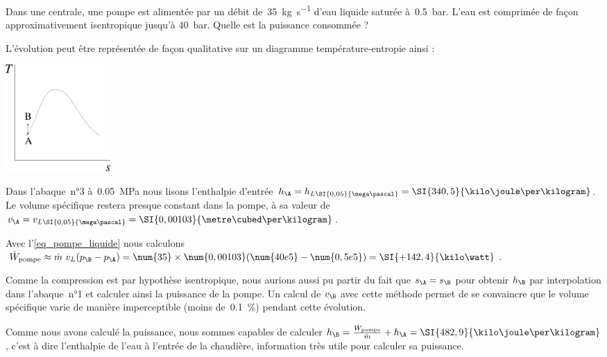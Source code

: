 			\onlyframabook{\clearfloats}
		 	\begin{anexample}
		 	\label{exemple_pompe_centrale}
		 		Dans une centrale, une pompe est alimentée par un débit de~\SI{35}{\kilogram\per\second} d’eau liquide saturée à~\SI{0,5}{\bar}. L’eau est comprimée de façon approximativement isentropique jusqu’à \SI{40}{\bar}. Quelle est la puissance consommée ?
		 			\begin{answer}
			 			L’évolution peut être représentée de façon qualitative sur un diagramme température-entropie ainsi :
						\begin{center}\includegraphics[width=4cm]{images/exe_ts_pompe.png}\end{center}
		 				Dans l’abaque~n°3 à~\SI{0,05}{\mega\pascal} nous lisons l’enthalpie d’entrée $h_\A = h_{L \SI{0,05}{\mega\pascal}} = \SI{340,5}{\kilo\joule\per\kilogram}$. Le volume spécifique restera presque constant dans la pompe, à sa valeur de $v_\A = v_{L \SI{0,05}{\mega\pascal}} = \SI{0,00103}{\metre\cubed\per\kilogram}$.
		 				
		 				Avec l’\cref{eq_pompe_liquide} nous calculons $\dot W_\text{pompe} \approx \dot m \ v_L (p_\B - p_\A ) = \num{35} \times \num{0,00103} (\num{40e5} - \num{0,5e5}) = \SI{+142,4}{\kilo\watt}$.
		 				
		 					\begin{remark}Comme la compression est par hypothèse isentropique, nous aurions aussi pu partir du fait que $s_\A = s_\B$ pour obtenir $h_\B$ par interpolation dans l’abaque~n°1 et calculer ainsi la puissance de la pompe. Un calcul de $v_\B$ avec cette méthode permet de se convaincre que le volume spécifique varie de manière imperceptible (moins de~\SI{0,1}{\percent}) pendant cette évolution.\end{remark}
		 					\begin{remark}Comme nous avons calculé la puissance, nous sommes capables de calculer $h_\B = \frac{\dot W_\text{pompe}}{\dot m} + h_\A = \SI{482,9}{\kilo\joule\per\kilogram}$, c’est à dire l’enthalpie de l’eau à l’entrée de la chaudière, information très utile pour calculer sa puissance.\end{remark}
		 			\end{answer}
		 	\end{anexample}

